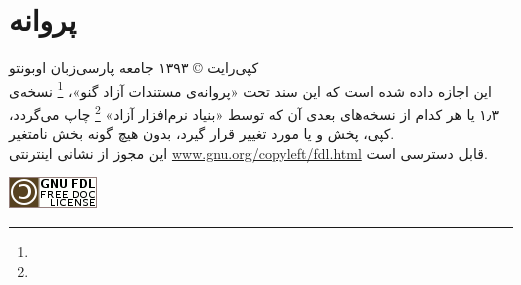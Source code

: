 \chapter*{پروانه}
کپی‌رایت
\copyright
۱۳۹۳ جامعه پارسی‌زبان اوبونتو \\
این اجازه داده شده است که این سند تحت «پروانه‌ی مستندات آزاد گنو»،
\footnote{}
نسخه‌ی ۱٫۳ یا هر کدام از نسخه‌های بعدی آن که توسط «بنیاد نرم‌افزار آزاد»
\footnote{}
چاپ می‌گردد، کپی، پخش و یا مورد تغییر قرار گیرد، بدون هیچ گونه بخش نامتغیر.\\
 این مجوز از نشانی اینترنتی
\url{www.gnu.org/copyleft/fdl.html}
قابل دسترسی است.
\begin{flushleft}
\includegraphics[scale=0.75]{pics/gnu-fdl.png} 
\end{flushleft}
